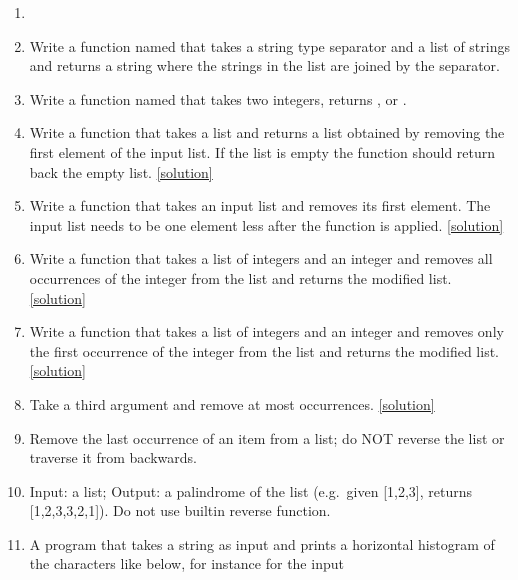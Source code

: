 \documentclass[a4paper]{article}
\begin{document}
{\begin{uexercise}
\begin{enumerate}
\item[]
\item Write a function named  that takes a string type separator and a list of strings
and returns a string where the strings in the list are joined by the separator. 
\item Write a function named  that takes two integers, returns
,  or .
\item Write a function that takes a list and returns a list obtained by removing
	the first element of the input list. If the list is empty the function should
return back the empty list.
\href{https://github.com/umutozge/prog-book/blob/master/code/remove_head.py}{[solution]}
\item Write a function that takes an input list and removes its first element.
The input list needs to be one element less after the function is applied.
\href{https://github.com/umutozge/prog-book/blob/master/code/remove_head_in_place.py}{[solution]}
\item Write a function that takes a list of integers and an integer and removes
all occurrences of the integer from the list and returns the modified
list.
\href{https://github.com/umutozge/prog-book/blob/master/code/remove_all.py}{[solution]}
\item Write a function that takes a list of integers and an integer and removes
only the first occurrence of the integer from the list and returns the modified
list. \href{https://github.com/umutozge/prog-book/blob/master/code/remove_first.py}{[solution]}
\item Take a third argument  and remove at most  occurrences.
\href{https://github.com/umutozge/prog-book/blob/master/code/remove_n.py}{[solution]}
\item Remove the last occurrence of an item from a list; do NOT reverse the list
or traverse it from backwards.
\item Input: a list; Output: a palindrome of the list (e.g.\ given [1,2,3],
returns [1,2,3,3,2,1]). Do not use builtin reverse function. 
\item A program that takes a string as input and prints a horizontal histogram of the
characters like below, for instance for the input 


\end{enumerate}
\end{uexercise}}
\end{document}
